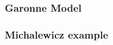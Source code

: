 \documentclass[hidelinks,12pt]{article}
\begin{document}
\subsubsection{Garonne Model }



\subsubsection{Michalewicz example}






\end{document}
